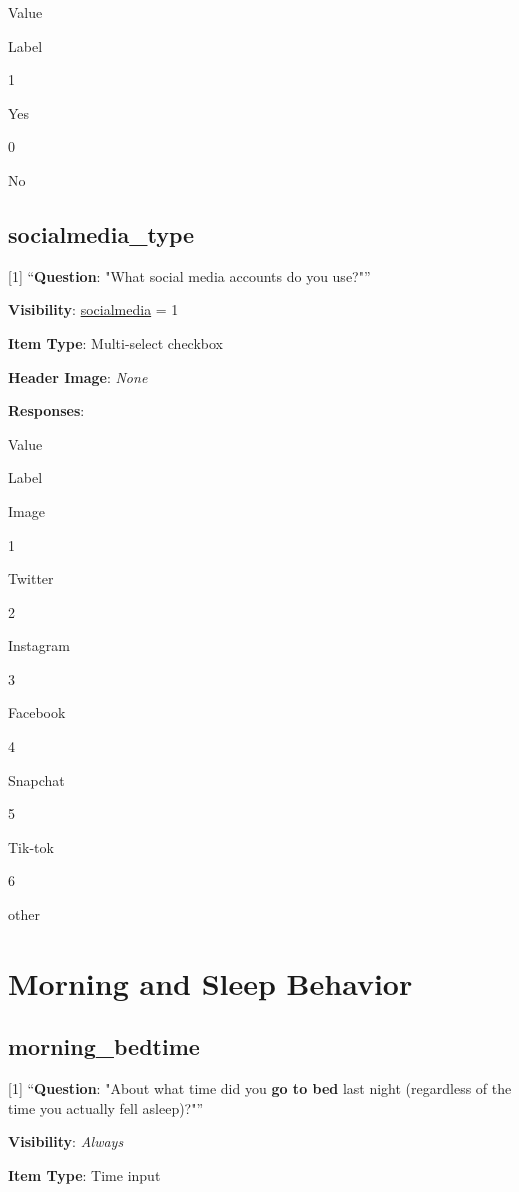\documentclass[]{book}
\begin{document}
Value

Label

1

Yes

0

No

\hypertarget{socialmedia_type}{%
\section{socialmedia\_type}\label{socialmedia_type}}

{[}1{]} ``\textbf{Question}: "What social media accounts do you use?"''

\textbf{Visibility}: \protect\hyperlink{socialmedia}{socialmedia} = 1

\textbf{Item Type}: Multi-select checkbox

\textbf{Header Image}: \emph{None}

\textbf{Responses}:

Value

Label

Image

1

Twitter

2

Instagram

3

Facebook

4

Snapchat

5

Tik-tok

6

other

\hypertarget{morning_section}{%
\chapter{Morning and Sleep Behavior}\label{morning_section}}

\hypertarget{morning_bedtime}{%
\section{morning\_bedtime}\label{morning_bedtime}}

{[}1{]} ``\textbf{Question}: "About what time did you \textbf{go to bed} last night (regardless of the time you actually fell asleep)?"''

\textbf{Visibility}: \emph{Always}

\textbf{Item Type}: Time input
\end{document}
